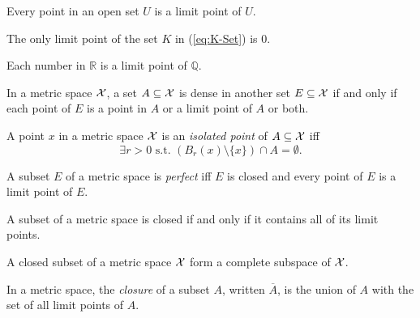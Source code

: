 \begin{exm}
  Every point in an open set $U$ is a limit point of $U$. 
\end{exm}

\begin{exm}
  The only limit point of the set $K$ in (\ref{eq:K-Set}) is 0.
\end{exm}

\begin{exm}
  Each number in $\mathbb{R}$ 
   is a limit point of $\mathbb{Q}$.
\end{exm}

\begin{lem}
  \label{lem:denseSet}
  In a metric space ${\cal X}$,
  a set $A\subseteq {\cal X}$ is dense
  in another set $E\subseteq{\cal X}$
  if and only if %
  each point of $E$ is a point in $A$
  or a limit point of $A$ or both.
\end{lem}

\begin{defn}
  A point $x$ in a metric space ${\cal X}$
   is an \emph{isolated point} of $A\subseteq {\cal X}$ iff
  \begin{equation}
    \label{eq:isolatedPointMetricSpace}
    \exists r>0 \text{ s.t. } \left(B_r(x)\setminus\{x\}\right)\cap A
    = \emptyset. 
  \end{equation}
\end{defn}

\begin{defn}
  \label{def:perfectSets}
  A subset $E$ of a metric space is \emph{perfect}
  iff $E$ is closed and every point of $E$
  is a limit point of $E$.
\end{defn}

\begin{lem}
  \label{lem:closedSetsContainsAllLimitPoints}
  A subset of a metric space is closed
  if and only if it contains all of its limit points.
\end{lem}

\begin{coro}
  \label{coro:closedSubsetIsComplete}
  A closed subset of a metric space ${\cal X}$
  form a complete subspace of ${\cal X}$.
\end{coro}

\begin{defn}
  \label{def:closureInMetricSpace}
  In a metric space, 
  the \emph{closure} of a subset $A$,
  written $\overline{A}$,
  is the union of $A$ with the set of all limit points of $A$. 
\end{defn}

